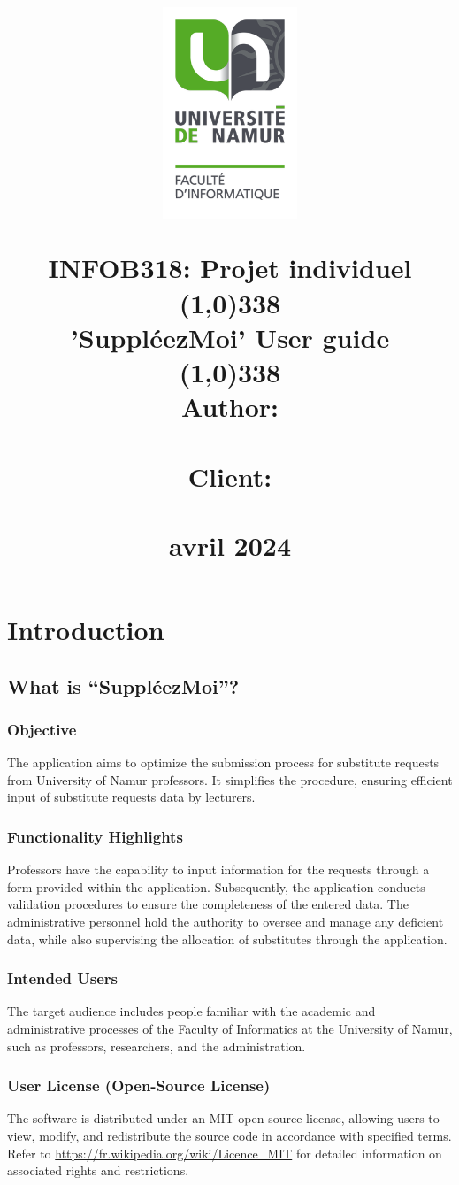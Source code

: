 \documentclass[12pt]{article}
\title{
    \vspace{-1in}
    \begin{center}
        \includegraphics[width=4cm]{logo.png} 
    \end{center}
  
    {\large INFOB318: Projet individuel}\\
    \bigskip
\line(1,0){338} \\ 
    \bigskip
    {\huge \textbf{'SuppléezMoi' User guide}} \\
    \bigskip
    \line(1,0){338} \\ 
    \bigskip
    Author: \\
    \text{Ulrich Touji Nana}\\
    \bigskip
    Client: \\
    \text{Babette di Guardia}\\
    \bigskip
    \bigskip
    12 avril 2024
}
\date{}
\begin{document}
\maketitle
\thispagestyle{empty} 

\newpage
\setcounter{page}{1} 
\tableofcontents
\newpage




\section{Introduction}

\subsection{What is “SuppléezMoi”?}
\subsubsection{Objective}
The application aims to optimize the submission process for substitute requests from University of Namur professors. It simplifies the procedure, ensuring efficient input of substitute requests data by lecturers.

\subsubsection{Functionality Highlights}
Professors have the capability to input information for the requests through a form provided within the application. Subsequently, the application conducts validation procedures to ensure the completeness of the entered data. The administrative personnel hold the authority to oversee and manage any deficient data, while also supervising the allocation of substitutes through the application.

\subsubsection{Intended Users}
The target audience includes people familiar with the academic and administrative processes of the Faculty of Informatics at the University of Namur, such as professors, researchers, and the administration.

\subsubsection{User License (Open-Source License)}
The software is distributed under an MIT open-source license, allowing users to view, modify, and redistribute the source code in accordance with specified terms. Refer to \url{https://fr.wikipedia.org/wiki/Licence_MIT} for detailed information on associated rights and restrictions.
\end{document}
